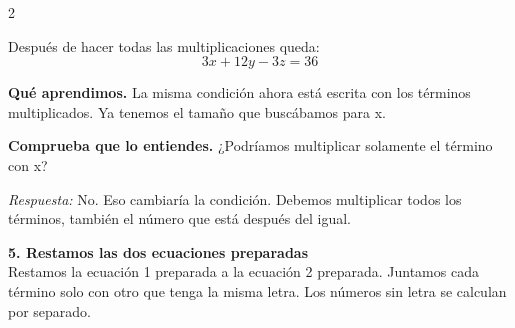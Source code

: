 \documentclass[11pt,a4paper,landscape]{article}
\begin{document}
\begin{multicols*}{2}
\begin{minipage}{\linewidth}
\par{}\par\smallskip
\par\smallskip Después de hacer todas las multiplicaciones queda:
\[3x + 12y - 3z = 36\]
\par\smallskip\textbf{Qué aprendimos.} La misma condición ahora está escrita con los términos multiplicados. Ya tenemos el tamaño que buscábamos para x.
\par\smallskip\textbf{Comprueba que lo entiendes.} ¿Podríamos multiplicar solamente el término con x?\par\textit{Respuesta:} No. Eso cambiaría la condición. Debemos multiplicar todos los términos, también el número que está después del igual.
\end{minipage}\par\medskip
\noindent\begin{minipage}{\linewidth}\textbf{5. Restamos las dos ecuaciones preparadas}\\[2pt]Restamos la ecuación 1 preparada a la ecuación 2 preparada. Juntamos cada término solo con otro que tenga la misma letra. Los números sin letra se calculan por separado.
\par{}\par\smallskip

\end{minipage}
\end{multicols*}
\end{document}
